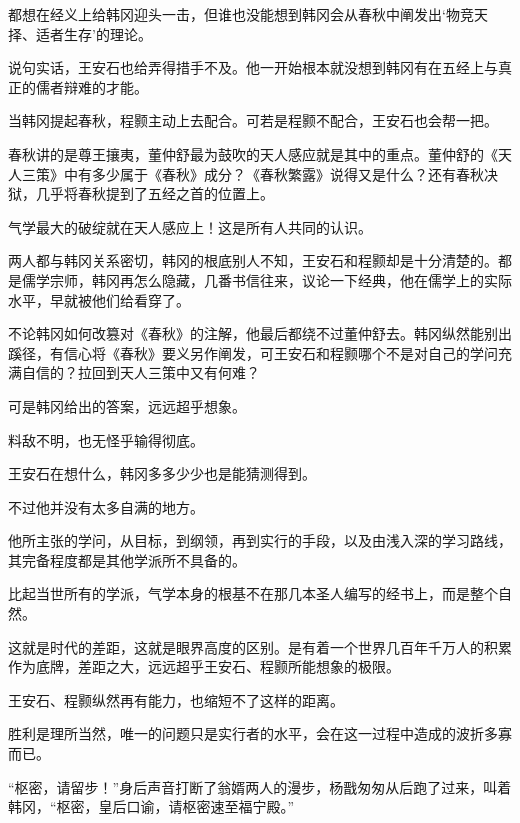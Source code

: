 都想在经义上给韩冈迎头一击，但谁也没能想到韩冈会从春秋中阐发出‘物竞天择、适者生存’的理论。

说句实话，王安石也给弄得措手不及。他一开始根本就没想到韩冈有在五经上与真正的儒者辩难的才能。

当韩冈提起春秋，程颢主动上去配合。可若是程颢不配合，王安石也会帮一把。

春秋讲的是尊王攘夷，董仲舒最为鼓吹的天人感应就是其中的重点。董仲舒的《天人三策》中有多少属于《春秋》成分？《春秋繁露》说得又是什么？还有春秋决狱，几乎将春秋提到了五经之首的位置上。

气学最大的破绽就在天人感应上！这是所有人共同的认识。

两人都与韩冈关系密切，韩冈的根底别人不知，王安石和程颢却是十分清楚的。都是儒学宗师，韩冈再怎么隐藏，几番书信往来，议论一下经典，他在儒学上的实际水平，早就被他们给看穿了。

不论韩冈如何改篡对《春秋》的注解，他最后都绕不过董仲舒去。韩冈纵然能别出蹊径，有信心将《春秋》要义另作阐发，可王安石和程颢哪个不是对自己的学问充满自信的？拉回到天人三策中又有何难？

可是韩冈给出的答案，远远超乎想象。

料敌不明，也无怪乎输得彻底。

王安石在想什么，韩冈多多少少也是能猜测得到。

不过他并没有太多自满的地方。

他所主张的学问，从目标，到纲领，再到实行的手段，以及由浅入深的学习路线，其完备程度都是其他学派所不具备的。

比起当世所有的学派，气学本身的根基不在那几本圣人编写的经书上，而是整个自然。

这就是时代的差距，这就是眼界高度的区别。是有着一个世界几百年千万人的积累作为底牌，差距之大，远远超乎王安石、程颢所能想象的极限。

王安石、程颢纵然再有能力，也缩短不了这样的距离。

胜利是理所当然，唯一的问题只是实行者的水平，会在这一过程中造成的波折多寡而已。

“枢密，请留步！”身后声音打断了翁婿两人的漫步，杨戬匆匆从后跑了过来，叫着韩冈，“枢密，皇后口谕，请枢密速至福宁殿。”

